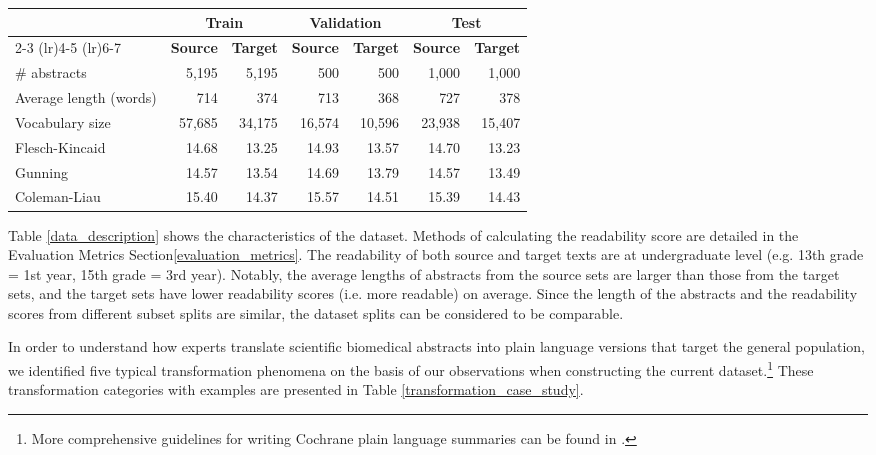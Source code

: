 \documentclass[letterpaper, table]{article}
\begin{document}
\begin{table*}
\centering
\begin{tabular}{@{} l rr rr rr @{}}
\toprule
& \multicolumn{2}{c}{\bf Train} & \multicolumn{2}{c}{\bf Validation} & \multicolumn{2}{c}{\bf Test} \\
\cmidrule(lr){2-3}
\cmidrule(lr){4-5}
\cmidrule(lr){6-7}
\multicolumn{1}{c}{}                           & \textbf{Source}       & \textbf{Target}
& \textbf{Source}       & \textbf{Target}
& \textbf{Source}       & \textbf{Target}      \\
\midrule
\# abstracts                              & 5,195        & 5,195       & 500            & 500            & 1,000       & 1,000       \\
Average length (words)                      & 714          & 374         & 713            & 368            & 727         & 378         \\
Vocabulary size                                  & 57,685       & 34,175       & 16,574         & 10,596         & 23,938      & 15,407      \\ \midrule
Flesch-Kincaid & 14.68 & 13.25 & 14.93 & 13.57 & 14.70 & 13.23\\
Gunning & 14.57 & 13.54 & 14.69 & 13.79 & 14.57 & 13.49\\
Coleman-Liau & 15.40 & 14.37 & 15.57 & 14.51 & 15.39 & 14.43 \\
\bottomrule

\end{tabular}
\caption{Dataset statistics across the different splits.}
\label{data_description}

\end{table*}


Table \ref{data_description} shows the characteristics of the dataset. Methods of calculating the readability score are detailed in the Evaluation Metrics Section\ref{evaluation_metrics}. The readability of both source and target texts are at undergraduate level (e.g. 13th grade = 1st year, 15th grade = 3rd year). Notably, the average lengths of abstracts from the source sets are larger than those from the target sets, and the target sets have lower readability scores (i.e. more readable) on average. Since the length of the abstracts and the readability scores from different subset splits are similar, the dataset splits can be considered to be comparable.



In order to understand how experts translate scientific biomedical abstracts into plain language versions that target the general population, we identified five typical transformation phenomena on the basis of our observations when constructing the current dataset.\footnote{More comprehensive guidelines for writing Cochrane plain language summaries can be found in \citet{mcilwain2014standards}.} These transformation categories with examples are presented in Table \ref{transformation_case_study}.
\end{document}
